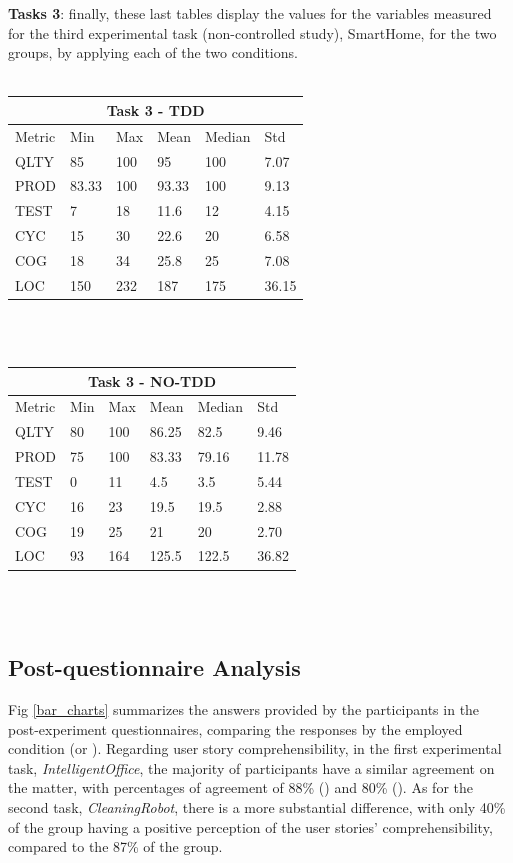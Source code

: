 \textbf{Tasks 3}: finally, these last tables display the values for the variables measured for the third experimental task (non-controlled study), SmartHome, for the two groups, by applying each of the two conditions.
\\ \  \\
\noindent
\begin{tabular}{ |p{2cm}||p{1.6cm}|p{1.6cm}|p{1.6cm}|p{1.6cm}|p{1.6cm}|}
    \hline
        \multicolumn{6}{|c|}{Task 3 - TDD} \\
    \hline
        Metric & Min & Max & Mean & Median & Std\\
    \hline
        QLTY & 85 & 100 & 95 & 100 & 7.07 \\
        PROD & 83.33 & 100 & 93.33 & 100 & 9.13 \\
        TEST & 7 & 18 & 11.6 & 12 & 4.15 \\
        CYC & 15 & 30 & 22.6 & 20 & 6.58 \\
        COG & 18 & 34 & 25.8 & 25 & 7.08 \\
        LOC & 150 & 232 & 187 & 175 & 36.15 \\
    \hline
\end{tabular}
\\ \  \\
\noindent
\begin{tabular}{ |p{2cm}||p{1.6cm}|p{1.6cm}|p{1.6cm}|p{1.6cm}|p{1.6cm}|}
    \hline
        \multicolumn{6}{|c|}{Task 3 - NO-TDD} \\
    \hline
        Metric & Min & Max & Mean & Median & Std\\
    \hline
        QLTY & 80 & 100 & 86.25 & 82.5 & 9.46 \\
        PROD & 75 & 100 & 83.33 & 79.16 & 11.78 \\
        TEST & 0 & 11 & 4.5 & 3.5 & 5.44 \\
        CYC & 16 & 23 & 19.5 & 19.5 & 2.88 \\
        COG & 19 & 25 & 21 & 20 & 2.70 \\
        LOC & 93 & 164 & 125.5 & 122.5 & 36.82 \\
    \hline
\end{tabular}
\\ \  \\


\subsection{Post-questionnaire Analysis}
Fig \ref{bar_charts} summarizes the answers provided by the participants in the post-experiment questionnaires, comparing the responses by the employed condition (\tdd or \notdd).
Regarding user story comprehensibility, in the first experimental task, \textit{IntelligentOffice}, the majority of participants have a similar agreement on the matter, with percentages of agreement of 88\% (\tdd) and 80\% (\notdd). As for the second task, \textit{CleaningRobot}, there is a more substantial difference, with only 40\% of the \tdd group having a positive perception of the user stories' comprehensibility, compared to the 87\% of the \notdd group.

